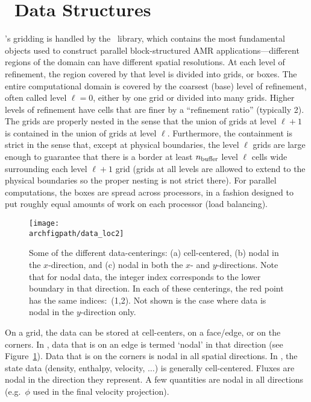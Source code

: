 \section{\amrex\ Data Structures}

\maestro's gridding is handled by the \amrex\ library, which
contains the most fundamental objects used to construct parallel
block-structured AMR applications---different
regions of the domain can have different spatial resolutions.
At each level of refinement, the region covered by that level is divided
into grids, or boxes.  The entire computational domain is covered by
the coarsest (base) level of refinement, often called level $\ell=0$, either by one
grid or divided into many grids.
Higher levels of refinement have cells that are finer by a ``refinement ratio''
(typically 2).  The grids are properly nested in the sense that the union 
of grids at level $\ell+1$ is contained in the union of grids at level $\ell$.
Furthermore, the containment is strict in the sense that, except at physical 
boundaries, the level $\ell$ grids are large enough to guarantee that there is
a border at least $n_{\rm buffer}$ level $\ell$ cells wide surrounding each level
$\ell +1$ grid (grids at all levels are allowed to extend to the physical
boundaries so the proper nesting is not strict there).  
For parallel computations, the boxes are spread across processors, in
a fashion designed to put roughly equal amounts of work on each
processor (load balancing).

\begin{figure}[t]
\centering
\texttt{[image: \\archfigpath/data\_loc2]}
\caption[Data-centerings on the grid]
  {\label{fig:dataloc} Some of the different data-centerings:
  (a) cell-centered, (b) nodal in the $x$-direction, and (c) nodal in
  both the $x$- and $y$-directions.  Note that for nodal data, the
  integer index corresponds to the lower boundary in that direction.
  In each of these centerings, the red point has the same indices:\ (1,2).
  Not shown is the case where data is nodal in the $y$-direction only.}
\end{figure}
On a grid, the data can be stored at cell-centers, on a face/edge, or
on the corners.  In \amrex, data that is on an edge is termed `nodal'
in that direction (see Figure~\ref{fig:dataloc}).  Data that is on the
corners is nodal in all spatial directions.  In \maestro, the state
data (density, enthalpy, velocity, $\ldots$) is generally
cell-centered.  Fluxes are nodal in the direction they represent.
A few quantities are nodal in all directions (e.g.\ $\phi$ used in
the final velocity projection).


